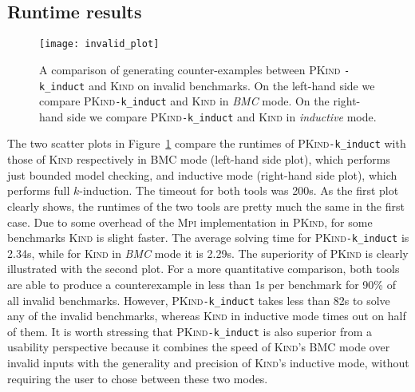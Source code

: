\documentclass[submission,copyright,creativecommons]{eptcs}
\newcommand{\Kind}{\textrm{\textsc{Kind}}\xspace}
\newcommand{\PKind}{\textrm{\textsc{PKind}}\xspace}
\newcommand{\Mpi}{\textrm{\textsc{Mpi}}\xspace}
\begin{document}
\vspace{-0.5cm}

\subsection{Runtime results}

\begin{figure}[t]
\centering
\texttt{[image: invalid\_plot]} 
\caption{ A comparison of generating counter-examples between \PKind
  \texttt{\small -k\_induct} and \Kind on invalid benchmarks. On the 
  left-hand side we compare \PKind \texttt{\small -k\_induct} and \Kind in
  \textit{BMC} mode. On the right-hand side we
  compare \PKind \texttt{\small -k\_induct} and \Kind in
  \textit{inductive} mode.  }
\label{fig:invalid}
\end{figure}

The two scatter plots in Figure~\ref{fig:invalid} compare
the runtimes of \PKind \texttt{\small -k\_induct} with those of \Kind
respectively in BMC mode (left-hand side plot),
which performs just bounded model checking,
and inductive mode (right-hand side plot),
which performs full $k$-induction.
The timeout for both tools was 200s. 
As the first plot clearly shows,
the runtimes of the two tools are pretty much the same in the first case. 
Due to some overhead of the \Mpi implementation in \PKind, 
for some benchmarks \Kind is slight faster. 
The average solving time for \PKind \texttt{\small -k\_induct} is 2.34s,
while for \Kind in \textit{BMC} mode it is 2.29s.
The superiority of \PKind is clearly illustrated with the second plot.
For a more quantitative comparison, 
both tools are able to produce a counterexample in less than 1s
per benchmark for 90\% of all invalid benchmarks.
However, \PKind \texttt{\small -k\_induct} takes less than 82s to solve
any of the invalid benchmarks,
whereas \Kind in inductive mode 
times out on half of them.
It is worth stressing that \PKind \texttt{\small -k\_induct} 
is also superior from a usability perspective 
because it combines the speed of \Kind's BMC mode over invalid inputs
with the generality and precision of \Kind's inductive mode,
without requiring the user to chose between these two modes.
\end{document}
